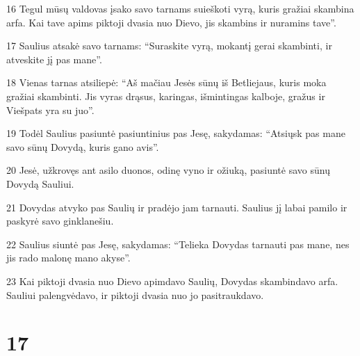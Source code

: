 \par 16 Tegul mūsų valdovas įsako savo tarnams suieškoti vyrą, kuris gražiai skambina arfa. Kai tave apims piktoji dvasia nuo Dievo, jis skambins ir nuramins tave”. 
\par 17 Saulius atsakė savo tarnams: “Suraskite vyrą, mokantį gerai skambinti, ir atveskite jį pas mane”. 
\par 18 Vienas tarnas atsiliepė: “Aš mačiau Jesės sūnų iš Betliejaus, kuris moka gražiai skambinti. Jis vyras drąsus, karingas, išmintingas kalboje, gražus ir Viešpats yra su juo”. 
\par 19 Todėl Saulius pasiuntė pasiuntinius pas Jesę, sakydamas: “Atsiųsk pas mane savo sūnų Dovydą, kuris gano avis”. 
\par 20 Jesė, užkrovęs ant asilo duonos, odinę vyno ir ožiuką, pasiuntė savo sūnų Dovydą Sauliui. 
\par 21 Dovydas atvyko pas Saulių ir pradėjo jam tarnauti. Saulius jį labai pamilo ir paskyrė savo ginklanešiu. 
\par 22 Saulius siuntė pas Jesę, sakydamas: “Telieka Dovydas tarnauti pas mane, nes jis rado malonę mano akyse”. 
\par 23 Kai piktoji dvasia nuo Dievo apimdavo Saulių, Dovydas skambindavo arfa. Sauliui palengvėdavo, ir piktoji dvasia nuo jo pasitraukdavo.



\chapter{17}

